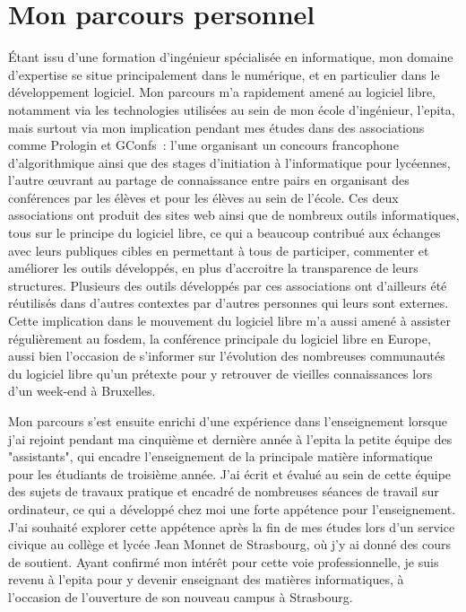 \section{Mon parcours personnel}

Étant issu d'une formation d'ingénieur spécialisée en informatique, mon domaine d'expertise se situe
principalement dans le numérique, et en particulier dans le développement logiciel. Mon parcours m'a
rapidement amené au logiciel libre, notamment via les technologies utilisées au sein de mon école d'ingénieur,
l'\gls{epita}, mais surtout via mon implication pendant mes études dans des associations comme
Prologin et GConfs : l'une organisant
un concours francophone d'algorithmique ainsi que des stages d'initiation à l'informatique pour
lycéennes, l'autre œuvrant au partage de connaissance entre pairs en
organisant des conférences par les élèves et pour les élèves au sein de l'école. Ces deux associations ont
produit des sites web ainsi que de nombreux outils informatiques, tous sur le principe du logiciel libre, ce
qui a beaucoup contribué aux échanges avec leurs publiques cibles en permettant à tous de participer,
commenter et améliorer les outils développés, en plus d'accroitre la transparence de leurs structures.
Plusieurs des outils développés par ces associations ont d'ailleurs été réutilisés dans d'autres contextes par
d'autres personnes qui leurs sont externes. Cette implication dans le mouvement du logiciel libre m'a aussi
amené à assister régulièrement au \gls{fosdem}, la conférence principale du
logiciel libre en Europe, aussi bien l'occasion de s'informer sur l'évolution des nombreuses communautés du
logiciel libre qu'un prétexte pour y retrouver de vieilles connaissances lors d'un week-end à Bruxelles.

Mon parcours s'est ensuite enrichi d'une expérience dans l'enseignement lorsque j'ai rejoint pendant ma
cinquième et dernière année à l'\gls{epita} la petite équipe des "assistants", qui encadre l'enseignement de
la principale matière informatique pour les étudiants de troisième année. J'ai écrit et évalué au sein de
cette équipe des sujets de travaux pratique et encadré de nombreuses séances de travail sur ordinateur, ce qui
a développé chez moi une forte appétence pour l'enseignement. J'ai souhaité explorer cette appétence après la
fin de mes études lors d'un service civique au collège et lycée Jean Monnet de Strasbourg, où j'y ai donné des
cours de soutient. Ayant confirmé mon intérêt pour cette voie professionnelle, je suis revenu à l'\gls{epita}
pour y devenir enseignant des matières informatiques, à l'occasion de l'ouverture de son nouveau campus à
Strasbourg.


